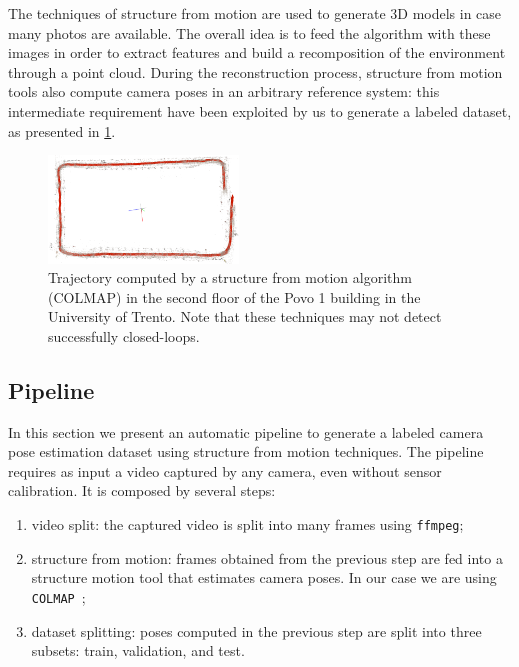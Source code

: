 The techniques of structure from motion are used to generate 3D models in case many photos are available. The overall idea is to feed the algorithm with these images in order to extract features and build a recomposition of the environment through a point cloud.
During the reconstruction process, structure from motion tools also compute camera poses in an arbitrary reference system: this intermediate requirement have been exploited by us to generate a labeled dataset, as presented in \cref{fig:trajectory-colmap}.

\begin{figure}[htbp]
    \begin{center}
        \includegraphics[width=0.45\textwidth]{./imgs/trajectory_colmap.png}
    \end{center}
    \caption{Trajectory computed by a structure from motion algorithm (COLMAP) in the second floor of the Povo 1 building in the University of Trento. Note that these techniques may not detect successfully closed-loops.}
    \label{fig:trajectory-colmap}
\end{figure}

\subsection{Pipeline}
In this section we present an automatic pipeline to generate a labeled camera pose estimation dataset using structure from motion techniques. The pipeline requires as input a video captured by any camera, even without sensor calibration. It is composed by several steps:
\begin{enumerate}
    \item video split: the captured video is split into many frames using \texttt{ffmpeg};
    \item structure from motion: frames obtained from the previous step are fed into a structure motion tool that estimates camera poses. In our case we are using \texttt{COLMAP}~\cite{colmap};
    \item dataset splitting: poses computed in the previous step are split into three subsets: train, validation, and test.
\end{enumerate}

